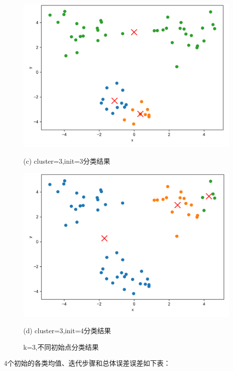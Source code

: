 \documentclass{article}
\begin{document}
\begin{figure}[htbp]
	\begin{minipage}{0.48\linewidth}
		\centerline{\includegraphics[width=0.7\linewidth]{img//fig3.png}}
		\centerline{(c)  cluster=3,init=3分类结果}
	\end{minipage}
	\begin{minipage}{0.48\linewidth}
		\centerline{\includegraphics[width=0.7\linewidth]{img//fig4.png}}
		\centerline{(d) cluster=3,init=4分类结果}
	\end{minipage}
	\caption{k=3,不同初始点分类结果}
\end{figure}


4个初始的各类均值、迭代步骤和总体误差误差如下表：
\end{document}
